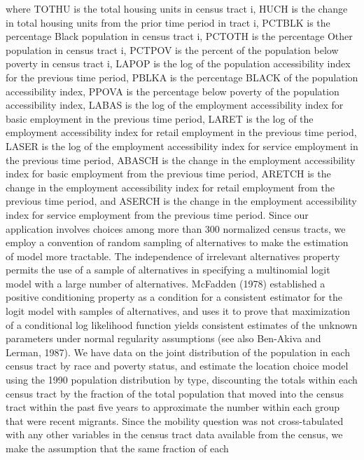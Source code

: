 \documentclass[12pt,a4paper]{article}
\begin{document}
where   TOTHU is the total housing units in census tract i,
    HUCH is the change in total housing units from the prior time period in tract i,
    PCTBLK is the percentage Black population in census tract i,
    PCTOTH is the percentage Other population in census tract i,
    PCTPOV is the percent of the population below poverty in census tract i,
    LAPOP is the log of the population accessibility index for the previous time period,
    PBLKA is the percentage BLACK of the population accessibility index,
    PPOVA is the percentage below poverty of the population accessibility index,
    LABAS is the log of the employment accessibility index for basic employment in the previous time period,
    LARET is the log of the employment accessibility index for retail employment in the previous time period,
    LASER is the log of the employment accessibility index for service employment in the previous time period,
    ABASCH is the change in the employment accessibility index for basic employment from the previous time period,
    ARETCH is the change in the employment accessibility index for retail employment from the previous time period, and
    ASERCH is the change in the employment accessibility index for service employment from the previous time period.
Since our application involves choices among more than 300
normalized census tracts, we employ a convention of random
sampling of alternatives to make the estimation of model more
tractable.  The independence of irrelevant alternatives property
permits the use of a sample of alternatives in specifying a
multinomial logit model with a large number of alternatives.
McFadden (1978) established a positive conditioning property as a
condition for a consistent estimator for the logit model with
samples of alternatives, and uses it to prove that maximization of
a conditional log likelihood function yields consistent estimates
of the unknown parameters under normal regularity assumptions (see
also Ben-Akiva and Lerman, 1987). We have data on the joint
distribution of the population in each census tract by race and
poverty status, and estimate the location choice model using the
1990 population distribution by type, discounting the totals
within each census tract by the fraction of the total population
that moved into the census tract within the past five years to
approximate the number within each group that were recent
migrants.  Since the mobility question was not cross-tabulated
with any other variables in the census tract data available from
the census, we make the assumption that the same fraction of each
\end{document}
